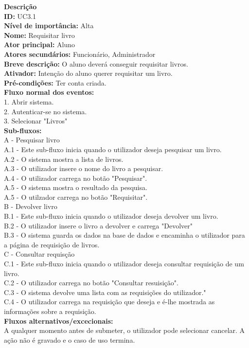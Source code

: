 \noindent \textbf{Descrição} \\
\textbf{ID:} UC3.1 \\  
\textbf{Nível de importância:} Alta \\
\textbf{Nome:} Requisitar livro \\
\textbf{Ator principal:} Aluno \\
\textbf{Atores secundários:} Funcionário, Administrador \\
\textbf{Breve descrição:} O aluno deverá conseguir requisitar livros. \\ 
\textbf{Ativador:} Intenção do aluno querer requisitar um livro.  \\
\textbf{Pré-condições:} Ter conta criada. \\
\textbf{Fluxo normal dos eventos:} \\
1. Abrir sistema.  \\
2. Autenticar-se no sistema. \\
3. Selecionar "Livros" \\
\textbf{Sub-fluxos:} \\ 
\indent A - Pesquisar livro\\
	\indent\indent A.1 - Este sub-fluxo inicia quando o utilizador deseja pesquisar um livro.\\
	\indent\indent A.2 - O sistema mostra a lista de livros.\\	
	\indent\indent A.3 - O utilizador insere o nome do livro a pesquisar.\\	
	\indent\indent A.4 - O utilizador carrega no botão "Pesquisar".\\	
	\indent\indent A.5 - O sistema mostra o resultado da pesquisa.\\	
	\indent\indent A.5 - O utilzador carrega no botão "Requisitar".\\
	\indent B - Devolver livro \\ 
	\indent\indent B.1 - Este sub-fluxo inicia quando o utilizador deseja devolver um livro.\\
	\indent\indent B.2 - O utilizador insere o livro a devolver e carrega "Devolver"\\
	\indent\indent B.3 - O sistema guarda os dados na base de dados e encaminha o utilizador para a página de requisição de livros.\\
	\indent C - Consultar requisção \\ 
	\indent\indent C.1 - Este sub-fluxo inicia quando o utilizador deseja consultar requisição de um livro.\\
	\indent\indent C.2 - O utilizador carrega no botão "Consultar resuisição".\\
	\indent\indent C.3 - O sistema devolve uma lista com as requisições do utilizador."\\
	\indent\indent C.4 - O utilizador carrega na requisição que deseja e é-lhe mostrada as informações sobre a requisição.\\
\textbf{Fluxos alternativos/excecionais:}  \\
	\indent A qualquer momento antes de submeter, o utilizador pode selecionar cancelar. A ação não é gravado e o caso de uso termina.\\

